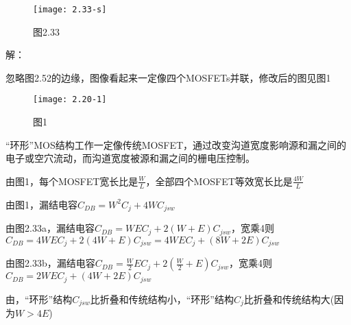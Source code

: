 




		\begin{figure}[H] %
	\begin{minipage}{\linewidth}
		\texttt{[image: 2.33-s]}
	\end{minipage}
	\caption*{图2.33} %
\end{figure}

解：

\scalebox{3}{（1）}

忽略图2.52的边缘，图像看起来一定像四个MOSFETs并联，修改后的图见图1

		\begin{figure}[H] %
	\begin{minipage}{\linewidth}
		\texttt{[image: 2.20-1]}
	\end{minipage}
	\caption*{图1} %
\end{figure}

“环形”MOS结构工作一定像传统MOSFET，通过改变沟道宽度影响源和漏之间的电子或空穴流动，而沟道宽度被源和漏之间的栅电压控制。

由图1，每个MOSFET宽长比是$\frac{W}{L}$，全部四个MOSFET等效宽长比是$\frac{4W}{L}$

\scalebox{3}{（2）}

由图1，漏结电容$C_{DB}=W^2C_j+4WC_{jsw}$

由图2.33a，漏结电容$C_{DB}=WEC_j+2(W+E)C_{jsw}$，宽乘4则$C_{DB}=4WEC_j+2(4W+E)C_{jsw}=4WEC_j+(8W+2E)C_{jsw}$

由图2.33b，漏结电容$C_{DB}=\frac{W}{2}EC_j+2(\frac{W}{2}+E)C_{jsw}$，宽乘4则$C_{DB}=2WEC_j+(4W+2E)C_{jsw}$

由，“环形”结构$C_{jsw}$比折叠和传统结构小，“环形”结构$C_j$比折叠和传统结构大(因为$W>4E$)




